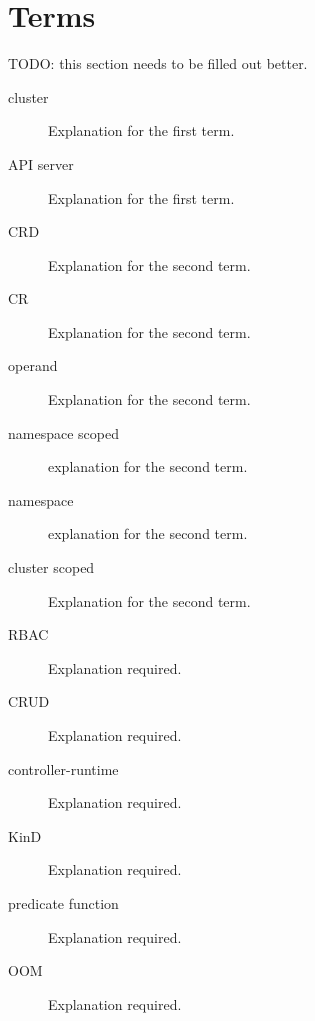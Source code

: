 \section{Terms}
\label{sec:term}

TODO: this section needs to be filled out better.

\begin{description}
	\item[cluster] Explanation for the first term.
	\item[API server] Explanation for the first term.
	\item[CRD] Explanation for the second term.
	\item[CR] Explanation for the second term.
	\item[operand] Explanation for the second term.
	\item[namespace scoped] explanation for the second term.
	\item[namespace] explanation for the second term.
	\item[cluster scoped] Explanation for the second term.
	\item[RBAC] Explanation required.
	\item[CRUD] Explanation required.
	\item[controller-runtime] Explanation required.
	\item[KinD] Explanation required.
	\item[predicate function] Explanation required.
	\item[OOM] Explanation required.
\end{description}
